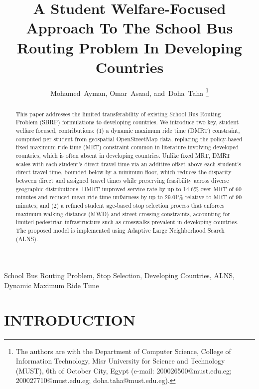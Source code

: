 \documentclass[journal]{IEEEtran}
\title{\LARGE \bf
A Student Welfare-Focused Approach To The School Bus Routing Problem 
In Developing Countries
}
\author{Mohamed~Ayman, 
        Omar~Asaad, 
        and~Doha~Taha%
\thanks{The authors are with the Department of Computer Science, College of Information Technology, Misr University for Science and Technology (MUST), 6th of October City, Egypt (e-mail: 200026500@must.edu.eg; 200027710@must.edu.eg; doha.taha@must.edu.eg).}}
\begin{document}
\maketitle
\thispagestyle{plain}
\pagestyle{plain}

\begin{abstract}
This paper addresses the limited transferability of existing School 
Bus Routing Problem (SBRP) formulations to developing countries. We 
introduce two key, student welfare focused, contributions: (1) a 
dynamic maximum ride time (DMRT) constraint, computed per student 
from geospatial OpenStreetMap data, replacing the policy-based fixed 
maximum ride time (MRT) constraint common in literature involving 
developed countries, which is often absent in developing countries. 
Unlike fixed MRT, DMRT scales with each student's direct travel time 
via an additive offset above each student’s direct travel time, bounded below by a minimum floor, which reduces the disparity between direct and assigned travel times while preserving feasibility across diverse geographic distributions. DMRT improved service rate by up to 14.6\% over MRT of 60 minutes and reduced mean ride-time unfairness by up to 29.01\% relative to MRT of 90 minutes; and (2) a 
refined student age-based stop selection process that enforces 
maximum walking distance (MWD) and street crossing constraints, 
accounting for limited pedestrian infrastructure such as crosswalks 
prevalent in developing countries. The proposed model is implemented 
using Adaptive Large Neighborhood Search (ALNS).
\end{abstract}

\begin{IEEEkeywords}
School Bus Routing Problem, Stop Selection, Developing Countries, 
ALNS, Dynamic Maximum Ride Time
\end{IEEEkeywords}

\section{INTRODUCTION}
\end{document}
